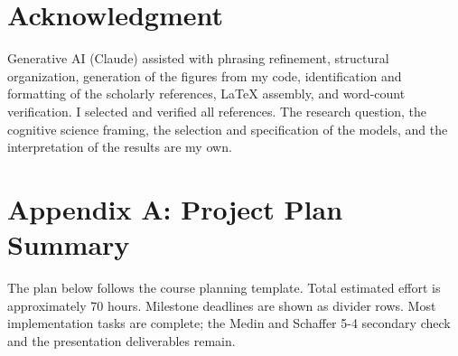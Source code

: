 \documentclass[conference]{IEEEtran}
\begin{document}
\section*{Acknowledgment}
Generative AI (Claude) assisted with phrasing refinement, structural
organization, generation of the figures from my code, identification and
formatting of the scholarly references, LaTeX assembly, and word-count
verification. I selected and verified all references. The research question, the
cognitive science framing, the selection and specification of the models, and the
interpretation of the results are my own.




\newpage
\appendices

\section*{Appendix A: Project Plan Summary}
The plan below follows the course planning template. Total estimated effort is
approximately 70 hours. Milestone deadlines are shown as divider rows. Most
implementation tasks are complete; the Medin and Schaffer 5-4 secondary check and
the presentation deliverables remain.
\end{document}
